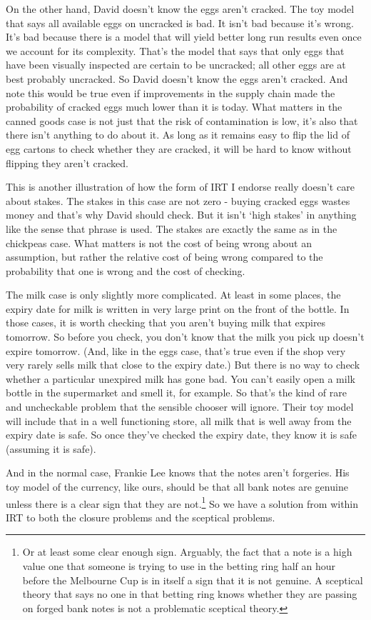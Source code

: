 \documentclass[
  12pt,
  letterpaper,
]{scrbook}
\begin{document}
On the other hand, David doesn't know the eggs aren't cracked. The toy
model that says all available eggs on uncracked is bad. It isn't bad
because it's wrong. It's bad because there is a model that will yield
better long run results even once we account for its complexity. That's
the model that says that only eggs that have been visually inspected are
certain to be uncracked; all other eggs are at best probably uncracked.
So David doesn't know the eggs aren't cracked. And note this would be
true even if improvements in the supply chain made the probability of
cracked eggs much lower than it is today. What matters in the canned
goods case is not just that the risk of contamination is low, it's also
that there isn't anything to do about it. As long as it remains easy to
flip the lid of egg cartons to check whether they are cracked, it will
be hard to know without flipping they aren't cracked.

This is another illustration of how the form of IRT I endorse really
doesn't care about stakes. The stakes in this case are not zero - buying
cracked eggs wastes money and that's why David should check. But it
isn't `high stakes' in anything like the sense that phrase is used. The
stakes are exactly the same as in the chickpeas case. What matters is
not the cost of being wrong about an assumption, but rather the relative
cost of being wrong compared to the probability that one is wrong and
the cost of checking.

The milk case is only slightly more complicated. At least in some
places, the expiry date for milk is written in very large print on the
front of the bottle. In those cases, it is worth checking that you
aren't buying milk that expires tomorrow. So before you check, you don't
know that the milk you pick up doesn't expire tomorrow. (And, like in
the eggs case, that's true even if the shop very very rarely sells milk
that close to the expiry date.) But there is no way to check whether a
particular unexpired milk has gone bad. You can't easily open a milk
bottle in the supermarket and smell it, for example. So that's the kind
of rare and uncheckable problem that the sensible chooser will ignore.
Their toy model will include that in a well functioning store, all milk
that is well away from the expiry date is safe. So once they've checked
the expiry date, they know it is safe (assuming it is safe).

And in the normal case, Frankie Lee knows that the notes aren't
forgeries. His toy model of the currency, like ours, should be that all
bank notes are genuine unless there is a clear sign that they are
not.\footnote{Or at least some clear enough sign. Arguably, the fact
  that a note is a high value one that someone is trying to use in the
  betting ring half an hour before the Melbourne Cup is in itself a sign
  that it is not genuine. A sceptical theory that says no one in that
  betting ring knows whether they are passing on forged bank notes is
  not a problematic sceptical theory.} So we have a solution from within
IRT to both the closure problems and the sceptical problems.
\end{document}
